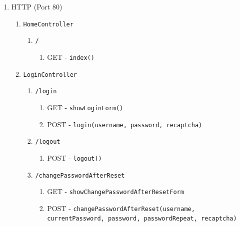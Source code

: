\documentclass[12pt,DIV14,BCOR10mm,a4paper,parskip=half-,headsepline,headinclude,english,ngerman,bibliography=totocnumbered]{scrreprt}
\begin{document}
\begin{enumerate}
  \item HTTP (Port 80)
  \begin{enumerate}
    \item \texttt{HomeController}
    \begin{enumerate}
     \item \texttt{/}
      \begin{enumerate}
        \item GET - \texttt{index()}
      \end{enumerate}
    \end{enumerate}

  \item \texttt{LoginController}
    \begin{enumerate}
     \item \texttt{/login}
      \begin{enumerate}
        \item GET - \texttt{showLoginForm()}
        \item POST - \texttt{login(username, password, recaptcha)}
      \end{enumerate}
      \item \texttt{/logout}
      \begin{enumerate}
        \item POST - \texttt{logout()}
      \end{enumerate}
      \item \texttt{/changePasswordAfterReset}
      \begin{enumerate}
        \item GET - \texttt{showChangePasswordAfterResetForm}
        \item POST - \texttt{changePasswordAfterReset(username, currentPassword, password, passwordRepeat, recaptcha)}
      \end{enumerate}
    \end{enumerate}


\end{enumerate}
\end{enumerate}
\end{document}
